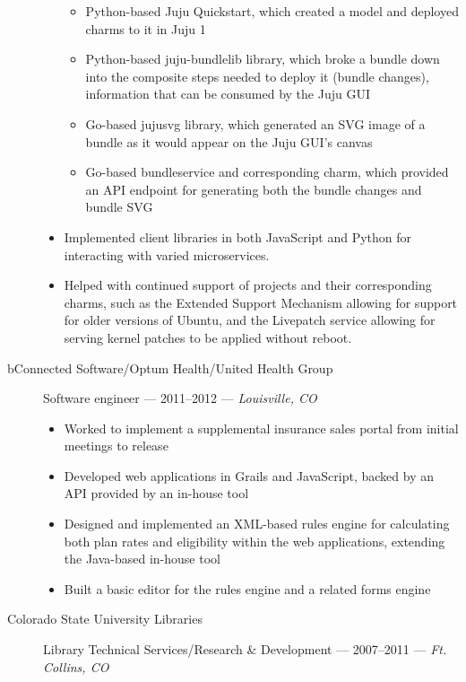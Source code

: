 \documentclass[letterpaper]{memoir}
\begin{document}
\begin{description}
\begin{itemize}
        \begin{itemize}
            \tightlist
            \item
            Python-based Juju Quickstart, which created a model and deployed charms to it in Juju 1
            \item
            Python-based juju-bundlelib library, which broke a bundle down into the composite steps needed to deploy it (bundle changes), information that can be consumed by the Juju GUI
            \item
            Go-based jujusvg library, which generated an SVG image of a bundle as it would appear on the Juju GUI's canvas
            \item
            Go-based bundleservice and corresponding charm, which provided an API endpoint for generating both the bundle changes and bundle SVG
        \end{itemize}
        \item
        Implemented client libraries in both JavaScript and Python for interacting with varied microservices.
        \item
        Helped with continued support of projects and their corresponding charms, such as the Extended Support Mechanism allowing for support for older versions of Ubuntu, and the Livepatch service allowing for serving kernel patches to be applied without reboot.
    \end{itemize}
    \item[bConnected Software/Optum Health/United Health Group]
    Software engineer --- 2011--2012 --- \emph{Louisville, CO}

    \begin{itemize}
        \tightlist
        \item
        Worked to implement a supplemental insurance sales portal from initial meetings to release
        \item
        Developed web applications in Grails and JavaScript, backed by an API provided by an in-house tool
        \item
        Designed and implemented an XML-based rules engine for calculating both plan rates and eligibility within the web applications, extending the Java-based in-house tool
        \item
        Built a basic editor for the rules engine and a related forms engine
    \end{itemize}
    \item[Colorado State University Libraries]
    Library Technical Services/Research \& Development --- 2007--2011 --- \emph{Ft. Collins, CO}


\end{description}
\end{document}
